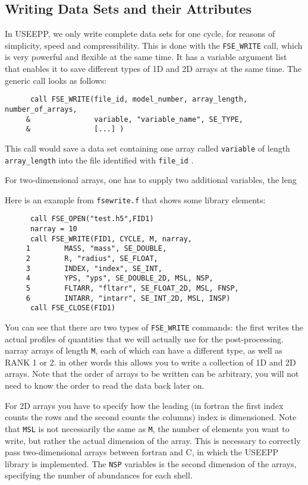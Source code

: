 \subsection{Writing Data Sets and their Attributes}

In USEEPP, we only write complete data sets for one cycle, for reasons of simplicity, speed and compressibility. This is done with the \verb!FSE_WRITE! call, which is very powerful and flexible at the same time. It has a variable argument list that enables it to save different types of 1D and 2D arrays at the same time. The generic call looks as follows: 

\begin{verbatim}
      call FSE_WRITE(file_id, model_number, array_length, number_of_arrays,
     &               variable, "variable_name", SE_TYPE,
     &               [...] )
\end{verbatim}

This call would save a data set containing one array called \verb!variable! of length \verb!array_length! into the file identified with \verb!file_id! . 

For two-dimensional arrays, one has to supply two additional variables, the leng

Here is an example from \verb!fsewrite.f!  that shows some library elements:
\begin{verbatim}
      call FSE_OPEN("test.h5",FID1)
      narray = 10
      call FSE_WRITE(FID1, CYCLE, M, narray,
     1        MASS, "mass", SE_DOUBLE,
     2        R, "radius", SE_FLOAT,
     3        INDEX, "index", SE_INT,
     4        YPS, "yps", SE_DOUBLE_2D, MSL, NSP,
     5        FLTARR, "fltarr", SE_FLOAT_2D, MSL, FNSP,
     6        INTARR, "intarr", SE_INT_2D, MSL, INSP)
      call FSE_CLOSE(FID1)
\end{verbatim}

You can see that there are two types of \verb!FSE_WRITE! commands:
the first writes the actual profiles of quantities that we will
actually use for the post-processing. narray arrays of length \verb!M!, each
of which can have a different type, as well as RANK 1 or 2. in other
words this allows you to write a collection of 1D and 2D arrays. Note that the order of arrays to be written can be arbitrary, you will not need to know the order to read the data back later on.

For 2D arrays you have to specify how the leading (in fortran the first
index counts the rows and the second counts the columns) index is
dimensioned. Note that \verb!MSL! is not necessarily the same as \verb!M!, the number of elements you want to write, but rather the actual dimension of the array. This is necessary to correctly pass two-dimensional arrays between fortran and C, in which the USEEPP library is implemented. The \verb!NSP! variables is the second dimension of the arrays, specifying the number of abundances for each shell. 

